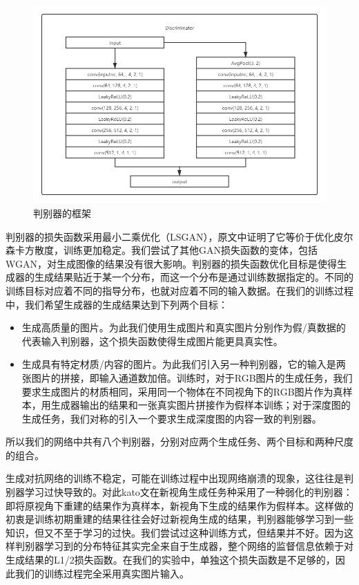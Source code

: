 \documentclass[UTF8,openany,AutoFakeBold,AutoFakeSlant,cs4size]{ctexbook}
\begin{document}
\begin{figure}[h]
\centering
\includegraphics[width=15cm]{./images/discriminator.png}
\caption{判别器的框架}
\label{fig:sample}
\end{figure}

判别器的损失函数采用最小二乘优化（LSGAN），原文中证明了它等价于优化皮尔森卡方散度，训练更加稳定。我们尝试了其他GAN损失函数的变体，包括WGAN，对生成图像的结果没有很大影响。判别器的损失函数优化目标是使得生成器的生成结果贴近于某一个分布，而这一个分布是通过训练数据指定的。不同的训练目标对应着不同的指导分布，也就对应着不同的输入数据。在我们的训练过程中，我们希望生成器的生成结果达到下列两个目标：

\begin{itemize}
	\item 生成高质量的图片。为此我们使用生成图片和真实图片分别作为假/真数据的代表输入判别器，这个损失函数使得生成图片能更具真实性。
	\item 生成具有特定材质/内容的图片。为此我们引入另一种判别器，它的输入是两张图片的拼接，即输入通道数加倍。训练时，对于RGB图片的生成任务，我们要求生成图片的材质相同，采用同一个物体在不同视角下的RGB图片作为真样本，用生成器输出的结果和一张真实图片拼接作为假样本训练；对于深度图的生成任务，我们对称的引入一个要求生成深度图的内容一致的判别器。
\end{itemize}

所以我们的网络中共有八个判别器，分别对应两个生成任务、两个目标和两种尺度的组合。

生成对抗网络的训练不稳定，可能在训练过程中出现网络崩溃的现象，这往往是判别器学习过快导致的。对此kato文在新视角生成任务种采用了一种弱化的判别器：即将原视角下重建的结果作为真样本，新视角下生成的结果作为假样本。这样做的初衷是训练初期重建的结果往往会好过新视角生成的结果，判别器能够学习到一些知识，但又不至于学习的过快。我们尝试过这种训练方式，但结果并不好。因为这样判别器学习到的分布特征其实完全来自于生成器，整个网络的监督信息依赖于对生成结果的L1/2损失函数。在我们的实验中，单独这个损失函数是不足够的，因此我们的训练过程完全采用真实图片输入。
\end{document}
